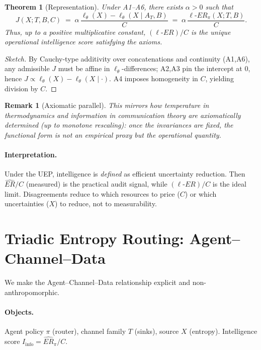 \documentclass[12pt,a4paper]{article}
\newtheorem{theorem}{Theorem}
\newtheorem{remark}{Remark}
\newcommand{\ERideal}{\ell\text{-}ER}
\newcommand{\Iinfo}{I_{\mathrm{info}}}
\begin{document}
\begin{theorem}[Representation]
\label{thm:representation}
Under A1--A6, there exists $\alpha>0$ such that
\begin{equation}
J(X;T,B,C)\;=\;\alpha\,\frac{\ell_\theta(X)-\ell_\theta(X\mid A_T,B)}{C}\;=\;\alpha\,\frac{\ERideal_\pi(X;T,B)}{C}.
\end{equation}
Thus, up to a positive multiplicative constant, $(\ERideal)/C$ is the \emph{unique} operational intelligence score satisfying the axioms.
\end{theorem}
\begin{proof}[Sketch]
By Cauchy-type additivity over concatenations and continuity (A1,A6), any admissible $J$ must be affine in $\ell_\theta$-differences; A2,A3 pin the intercept at $0$, hence $J\propto \ell_\theta(X)-\ell_\theta(X\mid\cdot)$. A4 imposes homogeneity in $C$, yielding division by $C$.
\end{proof}

\begin{remark}[Axiomatic parallel]
This mirrors how \emph{temperature} in thermodynamics and \emph{information} in communication theory are \emph{axiomatically} determined (up to monotone rescaling): once the invariances are fixed, the functional form is not an empirical proxy but \emph{the} operational quantity.
\end{remark}

\paragraph{Interpretation.}
Under the UEP, intelligence is \emph{defined} as efficient uncertainty reduction. Then $\widehat{ER}/C$ (measured) is the practical audit signal, while $(\ERideal)/C$ is the ideal limit. Disagreements reduce to which resources to price ($C$) or which uncertainties ($X$) to reduce, not to measurability.

\section{Triadic Entropy Routing: Agent--Channel--Data}
\label{sec:triad}
We make the Agent--Channel--Data relationship explicit and non-anthropomorphic.

\paragraph{Objects.}
Agent policy $\pi$ (router), channel family $T$ (sinks), source $X$ (entropy). Intelligence score $\Iinfo=\widehat{ER}_\pi/C$.
\end{document}
